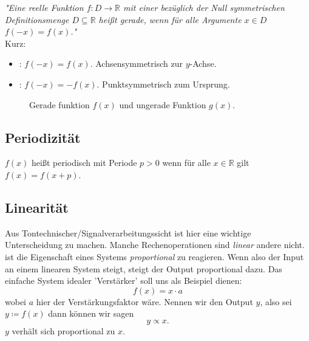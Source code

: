 \emph{"Eine reelle Funktion $f\colon D\to \mathbb {R} $ mit einer bezüglich der Null symmetrischen Definitionsmenge 
$ D\subseteq \mathbb {R}$ heißt gerade, wenn für alle Argumente $ x\in D$  $f(-x)=f(x)$."} \\

Kurz:
\begin{itemize}
    \item {}:  $f(-x) = f(x)$. Achsensymmetrisch zur $y$-Achse.
    \item {}:  $f(-x) = -f(x)$. Punktsymmetrisch zum Ursprung.
\end{itemize}

    \begin{figure}[H]
        \centering
        
        \caption{Gerade funktion $f(x)$ und ungerade Funktion $g(x)$.}
        \label{fig:evenUneven}
    \end{figure}







\subsection{Periodizität}
$f(x)$ heißt periodisch mit Periode $p>0$ wenn für alle $ x \in \mathbb{R}$ gilt $f(x) = f(x+p)$.

\subsection{Linearität}
Aus Tontechnischer/Signalverarbeitungssicht ist hier eine wichtige Unterscheidung zu machen. Manche Rechenoperationen sind \emph{linear} andere nicht. 
 ist die Eigenschaft eines Systems \emph{proportional} zu reagieren.
Wenn also der Input an einem linearen System steigt, steigt der Output proportional dazu. Das einfache System idealer 'Verstärker' soll uns als Beispiel dienen:
$$f(x) = x \cdot a$$ wobei $a$ hier der Verstärkungsfaktor wäre. Nennen wir den Output $y$, also sei $y \coloneqq f(x)$ dann können wir sagen $$y \propto x.$$ 
$y$ verhält sich proportional zu $x$. 

